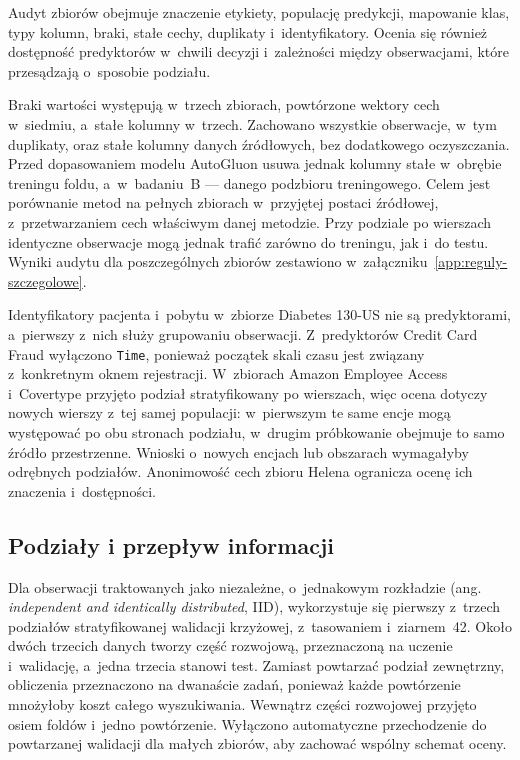 Audyt zbiorów obejmuje znaczenie etykiety, populację predykcji, mapowanie klas, typy kolumn, braki, stałe cechy, duplikaty i~identyfikatory. Ocenia się również dostępność predyktorów w~chwili decyzji i~zależności między obserwacjami, które przesądzają o~sposobie podziału.

Braki wartości występują w~trzech zbiorach, powtórzone wektory cech w~siedmiu, a~stałe kolumny w~trzech. Zachowano wszystkie obserwacje, w~tym duplikaty, oraz stałe kolumny danych źródłowych, bez dodatkowego oczyszczania. Przed dopasowaniem modelu AutoGluon usuwa jednak kolumny stałe w~obrębie treningu foldu, a~w~badaniu~B --- danego podzbioru treningowego. Celem jest porównanie metod na pełnych zbiorach w~przyjętej postaci źródłowej, z~przetwarzaniem cech właściwym danej metodzie. Przy podziale po wierszach identyczne obserwacje mogą jednak trafić zarówno do treningu, jak i~do testu. Wyniki audytu dla poszczególnych zbiorów zestawiono w~załączniku~\ref{app:reguly-szczegolowe}.

Identyfikatory pacjenta i~pobytu w~zbiorze Diabetes 130-US nie są predyktorami, a~pierwszy z~nich służy grupowaniu obserwacji. Z~predyktorów Credit Card Fraud wyłączono \texttt{Time}, ponieważ początek skali czasu jest związany z~konkretnym oknem rejestracji. W~zbiorach Amazon Employee Access i~Covertype przyjęto podział stratyfikowany po wierszach, więc ocena dotyczy nowych wierszy z~tej samej populacji: w~pierwszym te same encje mogą występować po obu stronach podziału, w~drugim próbkowanie obejmuje to samo źródło przestrzenne. Wnioski o~nowych encjach lub obszarach wymagałyby odrębnych podziałów. Anonimowość cech zbioru Helena ogranicza ocenę ich znaczenia i~dostępności.

\subsection{Podziały i przepływ informacji}
\label{sec:podzialy}

Dla obserwacji traktowanych jako niezależne, o~jednakowym rozkładzie (ang. \textit{independent and identically distributed}, IID), wykorzystuje się pierwszy z~trzech podziałów stratyfikowanej walidacji krzyżowej, z~tasowaniem i~ziarnem~42. Około dwóch trzecich danych tworzy część rozwojową, przeznaczoną na uczenie i~walidację, a~jedna trzecia stanowi test. Zamiast powtarzać podział zewnętrzny, obliczenia przeznaczono na dwanaście zadań, ponieważ każde powtórzenie mnożyłoby koszt całego wyszukiwania. Wewnątrz części rozwojowej przyjęto osiem foldów i~jedno powtórzenie. Wyłączono automatyczne przechodzenie do powtarzanej walidacji dla małych zbiorów, aby zachować wspólny schemat oceny.

